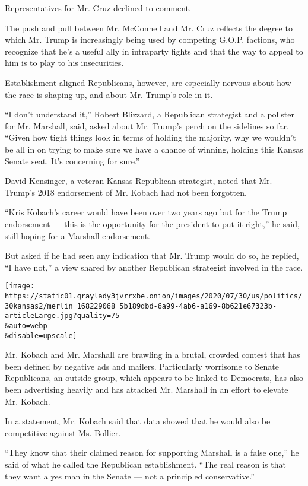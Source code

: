 Representatives for Mr. Cruz declined to comment.

The push and pull between Mr. McConnell and Mr. Cruz reflects the degree
to which Mr. Trump is increasingly being used by competing G.O.P.
factions, who recognize that he's a useful ally in intraparty fights and
that the way to appeal to him is to play to his insecurities.

Establishment-aligned Republicans, however, are especially nervous about
how the race is shaping up, and about Mr. Trump's role in it.

``I don't understand it,'' Robert Blizzard, a Republican strategist and
a pollster for Mr. Marshall, said, asked about Mr. Trump's perch on the
sidelines so far. ``Given how tight things look in terms of holding the
majority, why we wouldn't be all in on trying to make sure we have a
chance of winning, holding this Kansas Senate seat. It's concerning for
sure.''

David Kensinger, a veteran Kansas Republican strategist, noted that Mr.
Trump's 2018 endorsement of Mr. Kobach had not been forgotten.

``Kris Kobach's career would have been over two years ago but for the
Trump endorsement --- this is the opportunity for the president to put
it right,'' he said, still hoping for a Marshall endorsement.

But asked if he had seen any indication that Mr. Trump would do so, he
replied, ``I have not,'' a view shared by another Republican strategist
involved in the race.

\texttt{[image: https://static01.graylady3jvrrxbe.onion/images/2020/07/30/us/politics/30kansas2/merlin\_168229068\_5b189dbd-6a99-4ab6-a169-8b621e67323b-articleLarge.jpg?quality=75\\\&auto=webp\\\&disable=upscale]}

Mr. Kobach and Mr. Marshall are brawling in a brutal, crowded contest
that has been defined by negative ads and mailers. Particularly
worrisome to Senate Republicans, an outside group, which
\href{https://www.kansascity.com/news/politics-government/article244514962.html}{appears
to be linked} to Democrats, has also been advertising heavily and has
attacked Mr. Marshall in an effort to elevate Mr. Kobach.

In a statement, Mr. Kobach said that data showed that he would also be
competitive against Ms. Bollier.

``They know that their claimed reason for supporting Marshall is a false
one,'' he said of what he called the Republican establishment. ``The
real reason is that they want a yes man in the Senate --- not a
principled conservative.''

